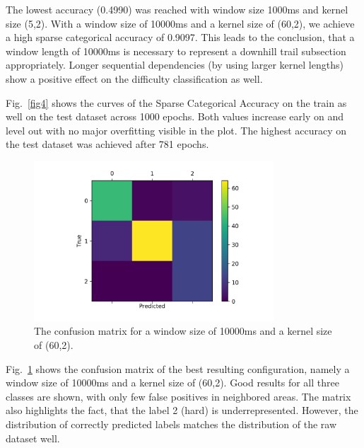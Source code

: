 \documentclass[runningheads]{llncs}
\begin{document}
\FloatBarrier

The lowest accuracy (0.4990) was reached with window size 1000ms and kernel size (5,2).
With a window size of 10000ms and a kernel size of (60,2), we achieve a high sparse categorical accuracy of 0.9097.
This leads to the conclusion, that a window length of 10000ms is necessary to represent a downhill trail subsection appropriately.
Longer sequential dependencies (by using larger kernel lengths) show a positive effect on the difficulty classification as well.



Fig.~\ref{fig4} shows the curves of the Sparse Categorical Accuracy on the train as well on the test dataset across 1000 epochs.
Both values increase early on and level out with no major overfitting visible in the plot.
The highest accuracy on the test dataset was achieved after 781 epochs.

\begin{figure}
\centering 
\vspace{-5mm}
\includegraphics[width=0.8\textwidth]{confusionmatrix.png}
\caption{The confusion matrix for a window size of 10000ms and a kernel size of (60,2).}
\label{fig5}	
\end{figure}


Fig.~\ref{fig5} shows the confusion matrix of the best resulting configuration, namely a window size of 10000ms and a kernel size of (60,2).
Good results for all three classes are shown, with only few false positives in neighbored areas. 
The matrix also highlights the fact, that the label 2 (hard) is underrepresented.
However, the distribution of correctly predicted labels matches the distribution of the raw dataset well.
\end{document}
